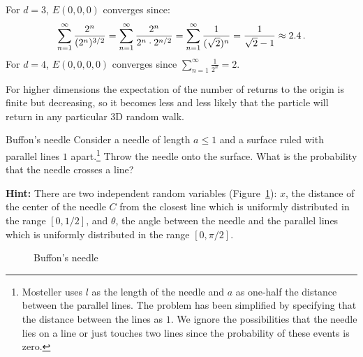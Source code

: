 For $d=3$, $E(0,0,0)$ converges since:
\[
\sum_{n=1}^{\infty} \displaystyle\frac{2^n}{(2^n)^{3/2}}=\sum_{n=1}^{\infty} \displaystyle\frac{2^n}{2^n\cdot 2^{n/2}}=\sum_{n=1}^{\infty} \displaystyle\frac{1}{(\sqrt{2})^n}=\frac{1}{\sqrt{2}-1}\approx 2.4\,.
\]
For $d=4$, $E(0,0,0,0)$ converges since $\sum_{n=1}^{\infty} \frac{1}{2^n}=2$.

For higher dimensions the expectation of the number of returns to the origin is finite but decreasing, so it becomes less and less likely that the particle will return in any particular 3D random walk.


\begin{prob}{Buffon's needle}
Consider a needle of length $a\leq 1$ and a surface ruled with parallel lines $1$ apart.\footnote{Mosteller uses $l$ as the length of the needle and $a$ as one-half the distance between the parallel lines. The problem has been simplified by specifying that the distance between the lines as $1$. We ignore the possibilities that the needle lies on a line or just touches two lines since the probability of these events is zero.} Throw the needle onto the surface. What is the probability that the needle crosses a line?

\textbf{Hint:} There are two independent random variables (Figure~\ref{f.buffon1}): $x$, the distance of the center of the needle $C$ from the closest line which is uniformly distributed in the range $[0,1/2]$, and $\theta$, the angle between the needle and the parallel lines which is uniformly distributed in the range $[0,\pi/2]$.

\begin{figure}[tb]
\begin{center}
\end{center}
\caption{Buffon's needle}\label{f.buffon1}
\end{figure}
\end{prob}


